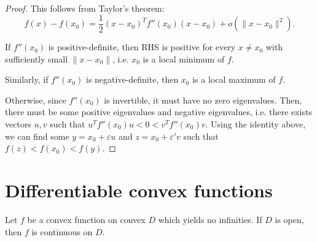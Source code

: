 \begin{proof}
  This follows from Taylor's theorem:
  \[
    f(x) - f(x_{0}) = \frac{1}{2} (x-x_{0})^{T}f''(x_{0})(x-x_{0}) +
    o(\|x-x_{0}\|^2)
  .\] 

  If \( f''(x_{0}) \) is positive-definite, then RHS is positive for every \( x
  \neq x_{0}\) with sufficiently small \( \|x-x_{0}\| \), i.e. \( x_{0} \) is a
  local minimum of \( f \).

  Similarly, if \( f''(x_{0}) \) is negative-definite, then \( x_{0} \) is a
  local maximum of \( f \).

  Otherwise, since \( f''(x_{0}) \) is invertible, it must have no zero
  eigenvalues. Then, there must be some positive eigenvalues and negative
  eigenvalues, i.e. there exists vectors \( u, v \) such that \( u^{T}f''(x_{0})u <  0
  < v^{T}f''(x_{0})v\). Using the identity above, we can find some \( y = x_{0}
  + \varepsilon u\) and \( z = x_{0} + \varepsilon' v \) such that \( f(z) <
  f(x_{0}) < f(y) \).
\end{proof}



\section{Differentiable convex functions} %
\label{sec:Differentiable convex functions}


\begin{theorem}
  Let \( f \) be a convex function on convex \( D \) which yields no infinities.
  If \( D \) is open, then \( f \) is continuous on \( D \).
\end{theorem}

